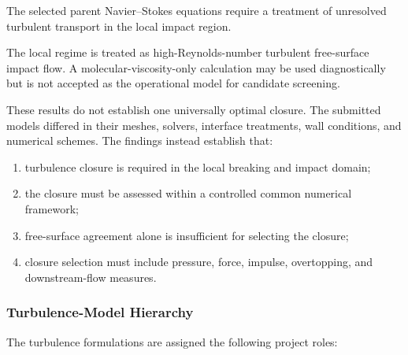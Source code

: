The selected parent Navier--Stokes equations require a treatment of
unresolved turbulent transport in the local impact region.

The local regime is treated as high-Reynolds-number turbulent
free-surface impact flow. A molecular-viscosity-only calculation may be
used diagnostically but is not accepted as the operational model for
candidate screening.

These results do not establish one universally optimal closure. The
submitted models differed in their meshes, solvers, interface
treatments, wall conditions, and numerical schemes. The findings
instead establish that:

\begin{enumerate}
  \item turbulence closure is required in the local breaking and
    impact domain;
  \item the closure must be assessed within a controlled common
    numerical framework;
  \item free-surface agreement alone is insufficient for selecting
    the closure;
  \item closure selection must include pressure, force, impulse,
    overtopping, and downstream-flow measures.
\end{enumerate}

\subsubsection{Turbulence-Model Hierarchy}
\label{sec:res-mod-src-local-turbulence-hierarchy}

The turbulence formulations are assigned the following project roles:


